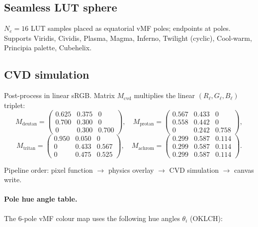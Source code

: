 \documentclass[11pt]{report}
\begin{document}
\subsection{Seamless LUT sphere}

$N_e=16$ LUT samples placed as equatorial vMF poles; endpoints at poles. Supports Viridis, Cividis, Plasma, Magma, Inferno, Twilight (cyclic), Cool-warm, Principia palette, Cubehelix.

\subsection{CVD simulation}

Post-process in linear sRGB. Matrix $M_{\text{cvd}}$ multiplies the linear $(R_\ell,G_\ell,B_\ell)$ triplet:
\[
M_{\text{deutan}}=\begin{pmatrix}0.625&0.375&0\\0.700&0.300&0\\0&0.300&0.700\end{pmatrix},\quad M_{\text{protan}}=\begin{pmatrix}0.567&0.433&0\\0.558&0.442&0\\0&0.242&0.758\end{pmatrix},
\]
\[
M_{\text{tritan}}=\begin{pmatrix}0.950&0.050&0\\0&0.433&0.567\\0&0.475&0.525\end{pmatrix},\quad M_{\text{achrom}}=\begin{pmatrix}0.299&0.587&0.114\\0.299&0.587&0.114\\0.299&0.587&0.114\end{pmatrix}.
\]

Pipeline order: pixel function $\to$ physics overlay $\to$ CVD simulation $\to$ canvas write.

\paragraph{Pole hue angle table.} The 6-pole vMF colour map uses the following hue angles $\theta_i$ (OKLCH):
\end{document}
